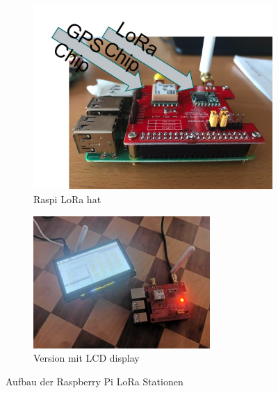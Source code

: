 \documentclass[ngerman, a4paper, 11pt]{scrartcl}
\begin{document}
 \begin{figure}[H]
	\centering
	\begin{subfigure}[b]{.53\textwidth}
		\centering
		\includegraphics[width=\textwidth]{./pic/raspi1a}
		\caption{Raspi LoRa hat}
	\end{subfigure}
	\hfill
	\begin{subfigure}[b]{.45\textwidth}
		\centering
		\includegraphics[width=\textwidth]{./pic/raspi2a}
		\caption{Version mit LCD display}
	\end{subfigure}
	
	\caption{Aufbau der Raspberry Pi LoRa Stationen}
	\label{fig:raspis}
\end{figure}
\end{document}
